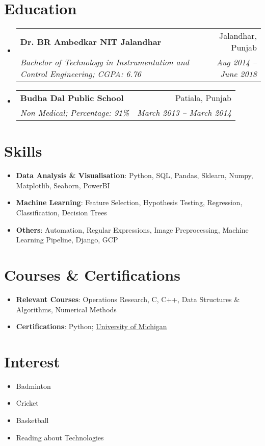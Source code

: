 \documentclass[letterpaper,11pt]{article}
\makeatletter
\newcommand{\resumeSubheading}[4]{
  \vspace{-1pt}\item
    \begin{tabular*}{0.97\textwidth}[t]{l@{\extracolsep{\fill}}r}
      \textbf{#1} & #2 \\
      \textit{\small#3} & \textit{\small #4} \\
    \end{tabular*}\vspace{-5pt}
}
\newcommand{\resumeSubHeadingListStart}{\begin{itemize}[leftmargin=*]}
\newcommand{\resumeSubHeadingListEnd}{\end{itemize}}
\makeatother
\begin{document}
\section{Education}
  \resumeSubHeadingListStart
    \resumeSubheading
      {Dr. BR Ambedkar NIT Jalandhar}{Jalandhar, Punjab}
      {Bachelor of Technology in Instrumentation and Control Engineering;  CGPA: 6.76}{Aug 2014 -- June 2018}
    \resumeSubheading
      {Budha Dal Public School}{Patiala, Punjab}
      {Non Medical; Percentage: 91\%}{March 2013 -- March 2014}
  \resumeSubHeadingListEnd

%
\section{Skills}
  \resumeSubHeadingListStart
    \item{
      \textbf{Data Analysis \& Visualisation}{: Python, SQL, Pandas, Sklearn, Numpy, Matplotlib, Seaborn, PowerBI}
      \hfill
    }
    \item{
      \textbf{Machine Learning}{: Feature Selection, Hypothesis Testing, Regression, Classification, Decision Trees}
      \hfill
    }
    \item{
      \textbf{Others}{: Automation, Regular Expressions, Image Preprocessing, Machine Learning Pipeline, Django, GCP}
      \hfill
    }
  \resumeSubHeadingListEnd

\section{Courses \& Certifications}
  \resumeSubHeadingListStart
    \item{
      \textbf{Relevant Courses}{: Operations Research, C, C++, Data Structures \& Algorithms, Numerical Methods}
      \hfill
    }
    \item{
      \textbf{Certifications}{: Python}; \underline{\href{https://www.coursera.org/account/accomplishments/certificate/BGRL6KFPRFAL}{University of Michigan}}
      \hfill
    }
  \resumeSubHeadingListEnd

\section{Interest}
  \resumeSubHeadingListStart
    \item{
      {Badminton}
      \hfill
    }
    \item{
      {Cricket}
      \hfill
    }
    \item{
      {Basketball}
      \hfill
    }
    \item{
      {Reading about Technologies}
      \hfill
    }
  \resumeSubHeadingListEnd


\end{document}
